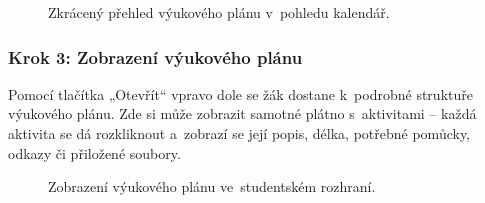 \documentclass[male,czech,api_bc]{kitheses}
\begin{document}
\begin{figure}[H]
	\centering
	\caption{Zkrácený přehled výukového plánu v~pohledu kalendář.}
	\label{fig:manual-10}
\end{figure}

\subsubsection{Krok 3: Zobrazení výukového plánu}
Pomocí tlačítka „Otevřít“ vpravo dole se žák dostane k~podrobné struktuře výukového plánu. Zde si může zobrazit samotné plátno s~aktivitami – každá aktivita se dá rozkliknout a~zobrazí se její popis, délka, potřebné pomůcky, odkazy či přiložené soubory.

\begin{figure}[H]
	\centering
	\caption{Zobrazení výukového plánu ve~studentském rozhraní.}
	\label{fig:manual-11}
\end{figure}
\end{document}

